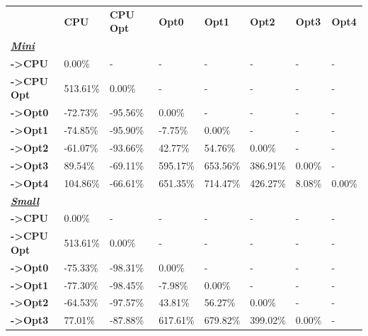 \begin{table}[H]
    \centering
    \begin{tabular}{llllllll}
    \rowcolor[HTML]{DAE8FC} \ &  \textbf{CPU} &  \textbf{CPU Opt} &  \textbf{Opt0} &  \textbf{Opt1} &  \textbf{Opt2} &  \textbf{Opt3} &  \textbf{Opt4} \\
    \cellcolor[HTML]{DAE8FC} \textbf{\textbf{{\emph{{\underline{{Mini}}}}}}} &  &  &  &  &  &  &  \\
    \rowcolor[HTML]{EFEFEF} \cellcolor[HTML]{DAE8FC} \textbf{->CPU} & 0.00\% & - & - & - & - & - & - \\
    \cellcolor[HTML]{DAE8FC} \textbf{->CPU Opt} & 513.61\% & 0.00\% & - & - & - & - & - \\
    \rowcolor[HTML]{EFEFEF} \cellcolor[HTML]{DAE8FC} \textbf{->Opt0} & -72.73\% & -95.56\% & 0.00\% & - & - & - & - \\
    \cellcolor[HTML]{DAE8FC} \textbf{->Opt1} & -74.85\% & -95.90\% & -7.75\% & 0.00\% & - & - & - \\
    \rowcolor[HTML]{EFEFEF} \cellcolor[HTML]{DAE8FC} \textbf{->Opt2} & -61.07\% & -93.66\% & 42.77\% & 54.76\% & 0.00\% & - & - \\
    \cellcolor[HTML]{DAE8FC} \textbf{->Opt3} & 89.54\% & -69.11\% & 595.17\% & 653.56\% & 386.91\% & 	0.00\% & - \\
    \rowcolor[HTML]{EFEFEF} \cellcolor[HTML]{DAE8FC} \textbf{->Opt4} & 104.86\% & -66.61\% & 651.35\% & 714.47\% & 426.27\% & 	8.08\% & 	0.00\% \\
    \cellcolor[HTML]{DAE8FC} \textbf{\textbf{{\emph{{\underline{{Small}}}}}}} &  &  &  &  &  &  &  \\
    \rowcolor[HTML]{EFEFEF} \cellcolor[HTML]{DAE8FC} \textbf{->CPU} & 0.00\% & - & - & - & - & - & - \\
    \cellcolor[HTML]{DAE8FC} \textbf{->CPU Opt} & 513.61\% & 0.00\% & - & - & - & - & - \\
    \rowcolor[HTML]{EFEFEF} \cellcolor[HTML]{DAE8FC} \textbf{->Opt0} & -75.33\% & -98.31\% & 0.00\% & - & - & - & - \\
    \cellcolor[HTML]{DAE8FC} \textbf{->Opt1} & -77.30\% & -98.45\% & -7.98\% & 0.00\% & - & - & - \\
    \rowcolor[HTML]{EFEFEF} \cellcolor[HTML]{DAE8FC} \textbf{->Opt2} & -64.53\% & -97.57\% & 43.81\% & 56.27\% & 0.00\% & - & - \\
    \cellcolor[HTML]{DAE8FC} \textbf{->Opt3} & 77.01\% & -87.88\% & 617.61\% & 679.82\% & 399.02\% & 	0.00\% & - \\

\end{tabular}
\end{table}
